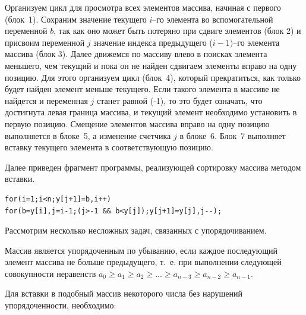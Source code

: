  Организуем цикл для просмотра всех элементов массива, начиная с первого (блок~1). Сохраним значение текущего
$i$–го элемента во вспомогательной переменной $b$, так как оно может быть потеряно
при сдвиге элементов (блок 2) и присвоим переменной $j$ значение индекса предыдущего
($i-1)$–го элемента массива (блок 3). Далее движемся по массиву влево в поисках элемента меньшего, чем
текущий и пока он не найден сдвигаем элементы вправо на одну позицию. Для этого организуем цикл (блок~4), который
прекратиться, как только будет найден элемент меньше текущего. Если такого элемента в массиве не найдется и переменная
$j$ станет равной (-1), то это будет означать, что достигнута левая граница массива, и текущий элемент
необходимо установить в первую позицию. Смещение элементов массива вправо на одну позицию выполняется в блоке~5, а
изменение счетчика $j$ в блоке~6. Блок~7 выполняет вставку текущего элемента в соответствующую
позицию.

Далее приведен фрагмент программы, реализующей сортировку массива методом вставки.
\begin{lstlisting}
for(i=1;i<n;y[j+1]=b,i++) 
for(b=y[i],j=i-1;(j>-1 && b<y[j]);y[j+1]=y[j],j--);
\end{lstlisting}

Рассмотрим несколько несложных задач, связанных с упорядочиванием.


Массив является упорядоченным по убыванию, если каждое последующий элемент массива не больше предыдущего, т.~е. при
выполнении следующей совокупности неравенств $a_0\ge a_1\ge a_2\ge ...\ge a_{n-3}\ge a_{n-2}\ge a_{n-1}$. 

Для вставки в подобный массив некоторого числа без нарушений упорядоченности, необходимо:

